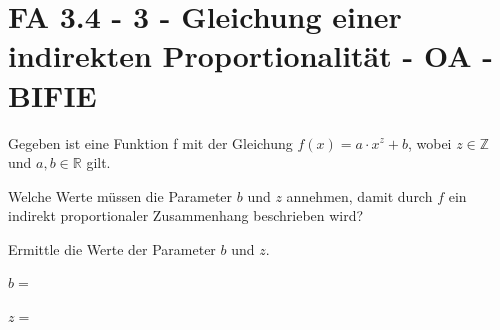 \section{FA 3.4 - 3 - Gleichung einer indirekten Proportionalität - OA - BIFIE}

\begin{beispiel}[FA 3.4]{1} %
Gegeben ist eine Funktion f mit der Gleichung $f(x) = a \cdot x^z + b$, wobei $z\in \mathbb{Z}$ und $a, b \in \mathbb{R}$ gilt.
\leer

Welche Werte müssen die Parameter $b$ und $z$ annehmen, damit durch $f$ ein indirekt proportionaler Zusammenhang beschrieben wird? \leer

Ermittle die Werte der Parameter $b$ und $z$.

\leer

$b=$\, \leer

$z=$\,
\end{beispiel}